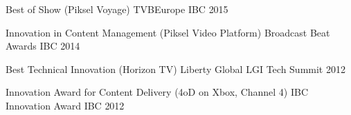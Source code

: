 


\begin{cvhonors}


\cvhonor
{Best of Show (Piksel Voyage)} %
{TVBEurope} %
{IBC} %
{2015} %


\cvhonor
{Innovation in Content Management (Piksel Video Platform)} %
{Broadcast Beat Awards} %
{IBC} %
{2014} %


\cvhonor
{Best Technical Innovation (Horizon TV)} %
{Liberty Global} %
{LGI Tech Summit} %
{2012} %


\cvhonor
{Innovation Award for Content Delivery (4oD on Xbox, Channel 4)} %
{IBC Innovation Award} %
{IBC} %
{2012} %


\end{cvhonors}
